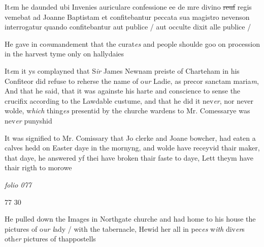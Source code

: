 \documentclass[12pt, a4paper]{book}
\begin{document}
	
				\marginpar[\vspace{0.5cm}{\textcolor{Gray}{Confession}}]{}
			
	
		\ifthenelse{\isodd{\thepage}}
		{\reversemarginpar}
		{\normalmarginpar}
		It\textit{e}m he daunded ubi Invenies auriculare confessione
 ee de mre divino \sout{reuf} regis
			 vemebat ad Joanne Baptistam
 et confitebantur peccata sua magistro nevenson interrogatur
 quando confitebantur aut publice / aut occulte dixit
 alle publice /


	
		\ifthenelse{\isodd{\thepage}}
		{\reversemarginpar}
		{\normalmarginpar}
		He gave in co\textit{m}mandement that the curat\textit{es} and people
 shoulde goo on procession in the harvest tyme only
 on hallydaies

		\ifthenelse{\isodd{\thepage}}
		{\reversemarginpar}
		{\normalmarginpar}
		It\textit{e}m it ys complayned that S\textit{ir} James Newnam preiste
 of Charteham in his Confiteor did refuse to reherse
 the name of o\textit{ur} Ladie, as precor sanctam maria\textit{m}, And
 that he said, that it was againste his harte and
 conscience to sense the crucifix according to the
 Lawdable custume, and that he did it nev\textit{er}, nor
 never wolde, w\textit{hich} thing\textit{es} presentid by the churche
	wardens to Mr. Comessarye was nev\textit{er} punyshid
	
		\ifthenelse{\isodd{\thepage}}
		{\reversemarginpar}
		{\normalmarginpar}
		It was signified to Mr. Comissary that Jo clerke
		and Joane bowcher, had eaten a calves hedd on
 Easter daye in the mornyng, and wolde have
 receyvid thair maker, that daye, he answered
 yf thei have broken thair faste to daye, Lett
 theym have thair rigth to morowe




\dotfill
						\newpage
{}

\textit{folio 077}


\begin{flushright}{\color{Mahogany}77} 30\end{flushright}
 
 	
			
 	
		\ifthenelse{\isodd{\thepage}}
		{\reversemarginpar}
		{\normalmarginpar}
		He pulled down the Images in Northgate churche
 and had home to his house the pictures of o\textit{ur l}ady / with
 the tabernacle, Hewid her all in pec\textit{es} w\textit{ith} div\textit{er}s oth\textit{er}
 pictures of thappostells
	
\end{document}
